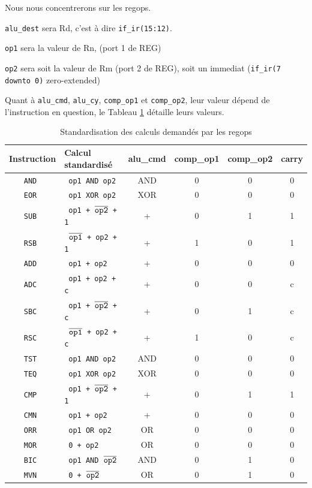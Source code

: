 \documentclass{article}
\begin{document}
Nous nous concentrerons sur les regops.

\texttt{alu\_dest} sera Rd, c'est à dire \texttt{if\_ir(15:12)}.

\texttt{op1} sera la valeur de Rn, (port 1 de REG)

\texttt{op2} sera soit la valeur de Rm (port 2 de REG), soit un immediat (\texttt{if\_ir(7 downto 0)} zero-extended)

Quant à \texttt{alu\_cmd}, \texttt{alu\_cy}, \texttt{comp\_op1} et \texttt{comp\_op2},
leur valeur dépend de l'instruction en question,
le Tableau \ref{regops-exe} détaille leurs valeurs.

\begin{table}[H]
\centering
\begingroup
\setlength{\tabcolsep}{5pt}
\renewcommand{\arraystretch}{1.1}
\begin{tabular}{ | c | l | c | c | c | c | }
\hline
Instruction & Calcul standardisé  & alu\_cmd & comp\_op1 & comp\_op2 & carry \\
\hline
\tt{AND}    &  \tt{ op1 AND op2 } &                             AND & 0 & 0 & 0 \\
\hline
\tt{EOR}    &  \tt{ op1 XOR op2 } &                             XOR & 0 & 0 & 0 \\
\hline
\tt{SUB}    &  \tt{ op1 + $\overline{\tt{op2}}$ + 1 } &           + & 0 & 1 & 1 \\
\hline
\tt{RSB}    &  \tt{ $\overline{\tt{op1}}$ + op2 + 1} &            + & 1 & 0 & 1 \\
\hline
\tt{ADD}    &  \tt{ op1 + op2 } &                                 + & 0 & 0 & 0 \\
\hline
\tt{ADC}    &  \tt{ op1 + op2 + c} &                              + & 0 & 0 & c \\
\hline
\tt{SBC}    &  \tt{ op1 + $\overline{\tt{op2}}$ + c} &            + & 0 & 1 & c \\
\hline
\tt{RSC}    &  \tt{ $\overline{\tt{op1}}$ + op2 + c} &            + & 1 & 0 & c \\
\hline
\tt{TST}    &  \tt{ op1 AND op2 } &                             AND & 0 & 0 & 0 \\
\hline
\tt{TEQ}    &  \tt{ op1 XOR op2 } &                             XOR & 0 & 0 & 0 \\
\hline
\tt{CMP}    &  \tt{ op1 + $\overline{\tt{op2}}$ + 1 } &           + & 0 & 1 & 1 \\
\hline
\tt{CMN}    &  \tt{ op1 + op2 } &                                 + & 0 & 0 & 0 \\
\hline
\tt{ORR}    &  \tt{ op1 OR op2 } &                               OR & 0 & 0 & 0 \\
\hline
\tt{MOR}    &  \tt{ 0 + op2 } &                                  OR & 0 & 0 & 0 \\
\hline
\tt{BIC}    &  \tt{ op1 AND $\overline{\tt{op2}}$ } &           AND & 0 & 1 & 0 \\
\hline
\tt{MVN}    &  \tt{ 0 + $\overline{\tt{op2}}$ } &                OR & 0 & 1 & 0 \\
\hline
\end{tabular}
\endgroup
\caption{Standardisation des calculs demandés par les regops}
\label{regops-exe}
\end{table}
\end{document}
